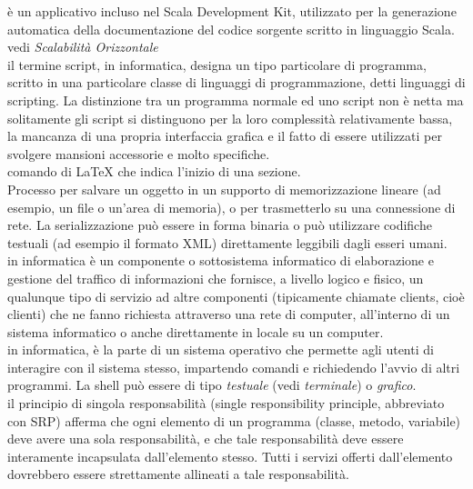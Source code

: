 \documentclass{scalatekids-article}
\begin{document}
   è un applicativo incluso nel Scala Development Kit, utilizzato per la generazione automatica della documentazione del codice sorgente scritto in linguaggio Scala.
  \\

   vedi \textit{Scalabilità Orizzontale}
  \\

   il termine script, in informatica, designa un tipo particolare di programma, scritto in una particolare classe di linguaggi di programmazione, detti linguaggi di scripting.
  La distinzione tra un programma normale ed uno script non è netta ma solitamente gli script si distinguono per la loro complessità relativamente bassa, la mancanza di una propria interfaccia grafica e il fatto di essere utilizzati per svolgere mansioni accessorie e molto specifiche.
  \\

   comando di \LaTeX\xspace che indica l'inizio di una sezione.
  \\
  
   Processo per salvare un oggetto in un supporto di memorizzazione lineare (ad esempio, un file o un'area di memoria), o per trasmetterlo su una connessione di rete. La serializzazione può essere in forma binaria o può utilizzare codifiche testuali (ad esempio il formato XML) direttamente leggibili dagli esseri umani.
  \\

   in informatica è un componente o sottosistema informatico di elaborazione e gestione del traffico di informazioni che fornisce, a livello logico e fisico, un qualunque tipo di servizio ad altre componenti (tipicamente chiamate clients, cioè clienti) che ne fanno richiesta attraverso una rete di computer, all'interno di un sistema informatico o anche direttamente in locale su un computer.
  \\
  
   in informatica, è la parte di un sistema operativo che permette agli utenti di interagire con il sistema stesso, impartendo comandi e richiedendo l'avvio di altri programmi.
  La shell può essere di tipo \textit{testuale} (vedi \textit{terminale}) o \textit{grafico}.
  \\

   il principio di singola responsabilità (single responsibility principle, abbreviato con SRP) afferma che ogni elemento di un programma (classe, metodo, variabile) deve avere una sola responsabilità, e che tale responsabilità deve essere interamente incapsulata dall'elemento stesso. Tutti i servizi offerti dall'elemento dovrebbero essere strettamente allineati a tale responsabilità.
  \\
\end{document}
